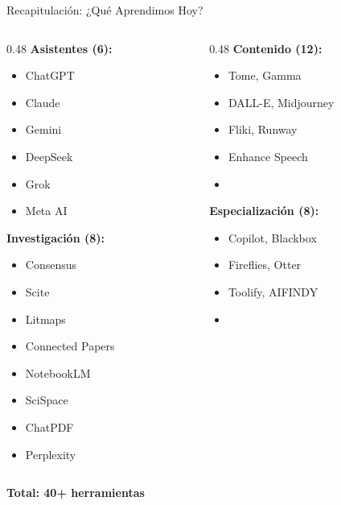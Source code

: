 \documentclass[aspectratio=169,xcolor={dvipsnames}]{beamer}
\begin{document}
	\begin{frame}{Recapitulación: ¿Qué Aprendimos Hoy?}
		
		\begin{columns}[T]
			\begin{column}{0.48\textwidth}
				\textbf{Asistentes (6):}
				\begin{itemize}
					\item ChatGPT
					\item Claude
					\item Gemini
					\item DeepSeek
					\item Grok
					\item Meta AI
				\end{itemize}
				
				\vspace{0.3cm}
				
				\textbf{Investigación (8):}
				\begin{itemize}
					\item Consensus
					\item Scite
					\item Litmaps
					\item Connected Papers
					\item NotebookLM
					\item SciSpace
					\item ChatPDF
					\item Perplexity
				\end{itemize}
			\end{column}
			
			\begin{column}{0.48\textwidth}
				\textbf{Contenido (12):}
				\begin{itemize}
					\item Tome, Gamma
					\item DALL-E, Midjourney
					\item Fliki, Runway
					\item Enhance Speech
					\item [...]
				\end{itemize}
				
				\vspace{0.3cm}
				
				\textbf{Especialización (8):}
				\begin{itemize}
					\item Copilot, Blackbox
					\item Fireflies, Otter
					\item Toolify, AIFINDY
					\item [...]
				\end{itemize}
			\end{column}
		\end{columns}
		
		\vspace{0.5cm}
		\centering
		{\LARGE \textbf{Total: 40+ herramientas}}
		
	\end{frame}
	
\end{document}
